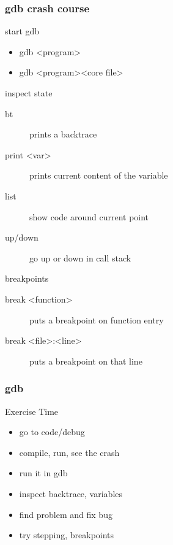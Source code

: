 \begin{frame}[fragile]
  \frametitle{gdb crash course}
  \begin{block}{start gdb}
    \begin{itemize}
    \item gdb \textless{}program\textgreater
    \item gdb \textless{}program\textgreater \textless{}core file\textgreater
    \end{itemize}
  \end{block}
  \begin{block}{inspect state}
    \begin{description}
    \item[bt] prints a backtrace
    \item[print \textless{}var\textgreater] prints current content of the variable
    \item[list] show code around current point
    \item[up/down] go up or down in call stack
    \end{description}
  \end{block}
  \begin{block}{breakpoints}
    \begin{description}
    \item[break \textless{}function\textgreater] puts a breakpoint on function entry
    \item[break \textless{}file\textgreater:\textless{}line\textgreater] puts a breakpoint on that line
    \end{description}
  \end{block}
\end{frame}

\begin{frame}[fragile]
  \frametitle{gdb}
  \begin{alertblock}{Exercise Time}
    \begin{itemize}
    \item go to code/debug
    \item compile, run, see the crash
    \item run it in gdb
    \item inspect backtrace, variables
    \item find problem and fix bug
    \item try stepping, breakpoints
    \end{itemize}
  \end{alertblock}
\end{frame}



